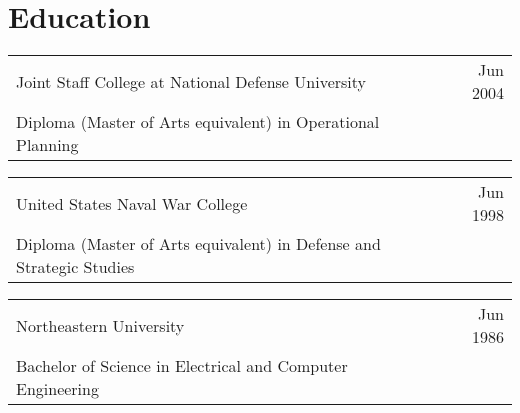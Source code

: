 \documentclass[letterpaper,11pt]{article}
\makeatletter
\newcommand{\resumeEducationHeading}[3]{
  \item 
    \vspace{-5pt}
    \begin{tabular*}{1.0\textwidth}[t]{l@{\extracolsep{\fill}}r}
      #1 & #2 \\
      {#3}
    \end{tabular*}
    \vspace{-20pt}
  }
\newcommand{\resumeHeadingListStart}{\begin{description}[leftmargin=*]}
\newcommand{\resumeHeadingListEnd}{\end{description}}
\makeatother
\begin{document}
\section{\textbf{Education}}
\resumeHeadingListStart
    \resumeEducationHeading
        {Joint Staff College at National Defense University}
        {Jun 2004}
        {Diploma (Master of Arts equivalent) in Operational Planning}
        \resumeEducationHeading
        {United States Naval War College}
        {Jun 1998}
        {Diploma (Master of Arts equivalent) in Defense and Strategic Studies}
        \resumeEducationHeading
        {Northeastern University}
        {Jun 1986}
        {Bachelor of Science in Electrical and Computer Engineering}
    \resumeHeadingListEnd



\end{document}
